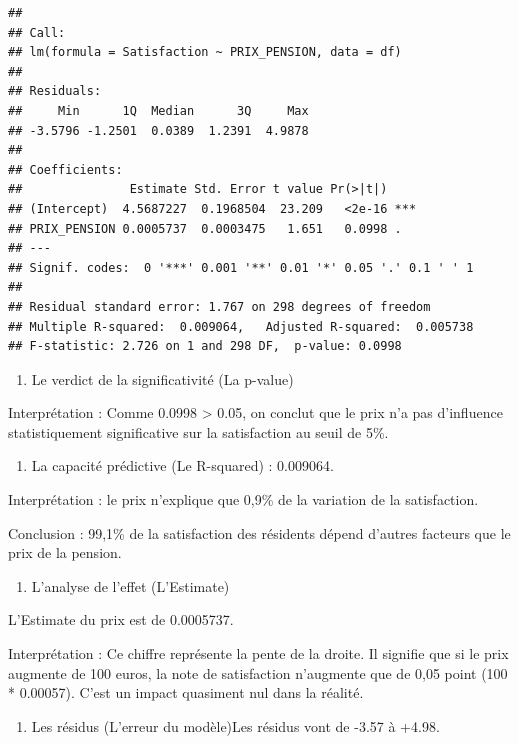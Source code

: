 \documentclass[
]{article}
\providecommand{\tightlist}{%
  \setlength{\itemsep}{0pt}\setlength{\parskip}{0pt}}
\begin{document}
\begin{verbatim}
## 
## Call:
## lm(formula = Satisfaction ~ PRIX_PENSION, data = df)
## 
## Residuals:
##     Min      1Q  Median      3Q     Max 
## -3.5796 -1.2501  0.0389  1.2391  4.9878 
## 
## Coefficients:
##               Estimate Std. Error t value Pr(>|t|)    
## (Intercept)  4.5687227  0.1968504  23.209   <2e-16 ***
## PRIX_PENSION 0.0005737  0.0003475   1.651   0.0998 .  
## ---
## Signif. codes:  0 '***' 0.001 '**' 0.01 '*' 0.05 '.' 0.1 ' ' 1
## 
## Residual standard error: 1.767 on 298 degrees of freedom
## Multiple R-squared:  0.009064,   Adjusted R-squared:  0.005738 
## F-statistic: 2.726 on 1 and 298 DF,  p-value: 0.0998
\end{verbatim}

\begin{enumerate}
\def\labelenumi{\arabic{enumi}.}
\tightlist
\item
  Le verdict de la significativité (La p-value)
\end{enumerate}

Interprétation : Comme 0.0998 \textgreater{} 0.05, on conclut que le
prix n'a pas d'influence statistiquement significative sur la
satisfaction au seuil de 5\%.

\begin{enumerate}
\def\labelenumi{\arabic{enumi}.}
\setcounter{enumi}{1}
\tightlist
\item
  La capacité prédictive (Le R-squared) : 0.009064.
\end{enumerate}

Interprétation : le prix n'explique que 0,9\% de la variation de la
satisfaction.

Conclusion : 99,1\% de la satisfaction des résidents dépend d'autres
facteurs que le prix de la pension.

\begin{enumerate}
\def\labelenumi{\arabic{enumi}.}
\setcounter{enumi}{2}
\tightlist
\item
  L'analyse de l'effet (L'Estimate)
\end{enumerate}

L'Estimate du prix est de 0.0005737.

Interprétation : Ce chiffre représente la pente de la droite. Il
signifie que si le prix augmente de 100 euros, la note de satisfaction
n'augmente que de 0,05 point (100 * 0.00057). C'est un impact quasiment
nul dans la réalité.

\begin{enumerate}
\def\labelenumi{\arabic{enumi}.}
\setcounter{enumi}{3}
\tightlist
\item
  Les résidus (L'erreur du modèle)Les résidus vont de -3.57 à +4.98.
\end{enumerate}
\end{document}
